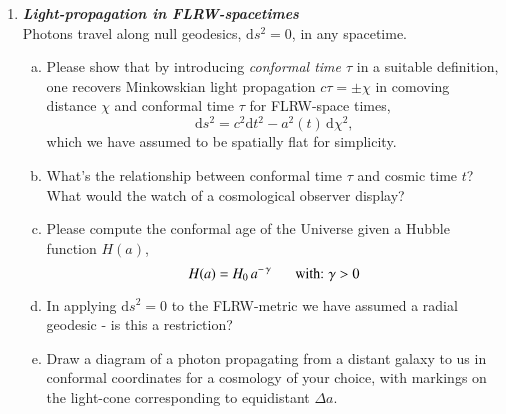 \documentclass[a4paper,12pt]{article}
\newcommand{\question}[1]{\textbf{\textit{#1}}}
\newcommand{\dd}{\mathrm{d}}
\begin{document}
\begin{enumerate}
\item \question{Light-propagation in FLRW-spacetimes}\\
Photons travel along null geodesics, $\dd s^2=0$, in any spacetime. 
\begin{enumerate}[(a)]
\item{Please show that by introducing {\em conformal time $\tau$} in a suitable definition, one recovers Minkowskian light propagation $c\tau = \pm\chi$ in comoving distance $\chi$ and conformal time $\tau$ for FLRW-space times,
\begin{equation}
\dd s^2 = c^2\dd t^2 - a^2(t)\,\dd\chi^2,
\end{equation}
which we have assumed to be spatially flat for simplicity.}
\item{What's the relationship between conformal time $\tau$ and cosmic time $t$? What would the watch of a cosmological observer display?}
\item{Please compute the conformal age of the Universe given a Hubble function $H(a)$,
\begin{equation}
H(a) = H_0 \, a^{-\,\gamma} \hspace*{6mm} \text{with: } \gamma > 0
\end{equation}
}
\item{In applying $\dd s^2=0$ to the FLRW-metric we have assumed a radial geodesic - is this a restriction?}
\item{Draw a diagram of a photon propagating from a distant galaxy to us in conformal coordinates for a cosmology of your choice, with markings on the light-cone corresponding to equidistant $\Delta a$.}
\end{enumerate}








\end{enumerate}
\end{document}
